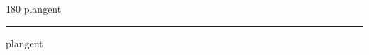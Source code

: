 
\begin{frame}
\begin{center}
\begin{turn}{180}
{\fontsize{2.5cm}{1em}\selectfont plangent}
\end{turn}
\vspace{1em}\par  
\hrule
\vspace{1em}\par  
{\fontsize{2.5cm}{1em}\selectfont plangent}
\end{center}
\end{frame}
